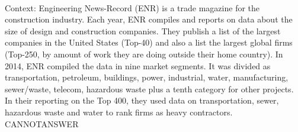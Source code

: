 \documentclass[11pt,a4paper, onecolumn]{article}
\begin{document}
\\ Context: Engineering News-Record (ENR) is a trade magazine for the construction industry. Each year, ENR compiles and reports on data about the size of design and construction companies. They publish a list of the largest companies in the United States (Top-40) and also a list the largest global firms (Top-250, by amount of work they are doing outside their home country). In 2014, ENR compiled the data in nine market segments. It was divided as transportation, petroleum, buildings, power, industrial, water, manufacturing, sewer/waste, telecom, hazardous waste plus a tenth category for other projects. In their reporting on the Top 400, they used data on transportation, sewer, hazardous waste and water to rank firms as heavy contractors. CANNOTANSWER
\end{document}
